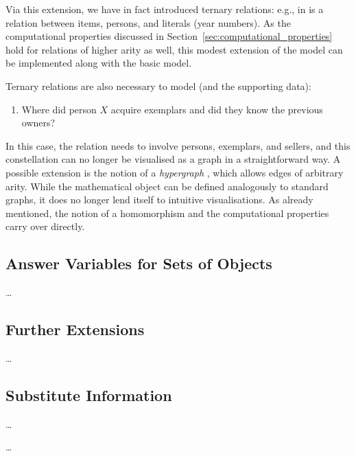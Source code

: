 Via this extension, we have in fact introduced ternary relations: e.g.,  in 
is a relation between items, persons, and literals (year numbers).
As the computational properties discussed in Section~\ref{sec:computational_properties}
hold for relations of higher arity as well, this modest extension of the model can be implemented
along with the basic model.

Ternary relations are also necessary to model  (and the supporting data):
%
\begin{enumerate}
  \item[\exaquery{9}]
    Where did person $X$ acquire exemplars and did they know the previous owners?
\end{enumerate}
%
In this case, the relation  needs to involve persons, exemplars, and sellers,
and this constellation can no longer be visualised as a graph in a straightforward way.
A possible extension is the notion of a \emph{hypergraph} \autocite[§7.1]{Voloshin2009},
which allows edges of arbitrary arity.
While the mathematical object can be defined analogously to standard graphs,
it does no longer lend itself to intuitive visualisations.
As already mentioned, the notion of a homomorphism and the computational properties
carry over directly.

\subsection{Answer Variables for Sets of Objects}

\dots

\subsection{Further Extensions}

\dots

\subsection{Substitute Information}

\dots





\dots

